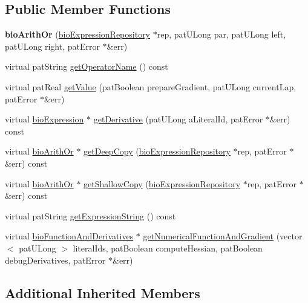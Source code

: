 \subsection*{Public Member Functions}
\begin{DoxyCompactItemize}
\item 
\mbox{\label{classbio_arith_or_a561f0b992c42bd8a634e5853d23fc172}} 
{\bfseries bio\+Arith\+Or} (\hyperlink{classbio_expression_repository}{bio\+Expression\+Repository} $\ast$rep, pat\+U\+Long par, pat\+U\+Long left, pat\+U\+Long right, pat\+Error $\ast$\&err)
\item 
virtual pat\+String \hyperlink{classbio_arith_or_afa8b3b4494ff72cdbbfda2012c56dc68}{get\+Operator\+Name} () const
\item 
virtual pat\+Real \hyperlink{classbio_arith_or_a59ec27e29f35c91f0a5fd2a8993a363b}{get\+Value} (pat\+Boolean prepare\+Gradient, pat\+U\+Long current\+Lap, pat\+Error $\ast$\&err)
\item 
virtual \hyperlink{classbio_expression}{bio\+Expression} $\ast$ \hyperlink{classbio_arith_or_a25b8deace8face416cb0cc711799506d}{get\+Derivative} (pat\+U\+Long a\+Literal\+Id, pat\+Error $\ast$\&err) const
\item 
virtual \hyperlink{classbio_arith_or}{bio\+Arith\+Or} $\ast$ \hyperlink{classbio_arith_or_aad2095426058f90fbb4acaa4ec9bf9fb}{get\+Deep\+Copy} (\hyperlink{classbio_expression_repository}{bio\+Expression\+Repository} $\ast$rep, pat\+Error $\ast$\&err) const
\item 
virtual \hyperlink{classbio_arith_or}{bio\+Arith\+Or} $\ast$ \hyperlink{classbio_arith_or_a64c0b100e6bc8d877bd25dbf5224ff0b}{get\+Shallow\+Copy} (\hyperlink{classbio_expression_repository}{bio\+Expression\+Repository} $\ast$rep, pat\+Error $\ast$\&err) const
\item 
virtual pat\+String \hyperlink{classbio_arith_or_aa31f4d5e3b2ac7df4c52b55f51819589}{get\+Expression\+String} () const
\item 
virtual \hyperlink{classbio_function_and_derivatives}{bio\+Function\+And\+Derivatives} $\ast$ \hyperlink{classbio_arith_or_a584c8a964a188ca03db9cf69400af290}{get\+Numerical\+Function\+And\+Gradient} (vector$<$ pat\+U\+Long $>$ literal\+Ids, pat\+Boolean compute\+Hessian, pat\+Boolean debug\+Derivatives, pat\+Error $\ast$\&err)
\end{DoxyCompactItemize}
\subsection*{Additional Inherited Members}


